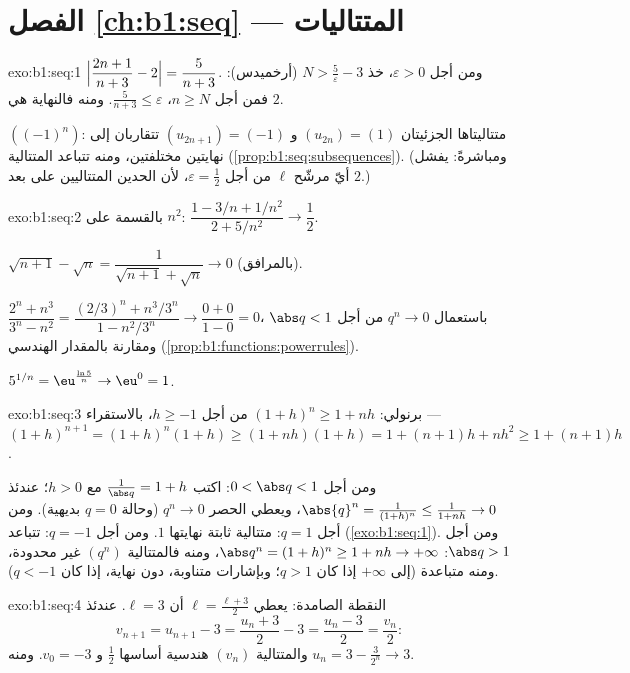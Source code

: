 \section*{الفصل \ref{ch:b1:seq} --- المتتاليات}

\begin{solution}{exo:b1:seq:1}
$\Bigl|\dfrac{2n+1}{n+3} - 2\Bigr| = \dfrac{5}{n+3}$. ومن أجل
$\varepsilon > 0$، خذ $N > \frac 5\varepsilon - 3$ (أرخميدس):
فمن أجل $n \geq N$، $\frac{5}{n+3} \leq \varepsilon$. ومنه فالنهاية هي
$2$.

$((-1)^n)$: متتاليتاها الجزئيتان $(u_{2n}) = (1)$ و $(u_{2n+1}) =
(-1)$ تتقاربان إلى نهايتين مختلفتين، ومنه تتباعد المتتالية
(\cref{prop:b1:seq:subsequences}). (ومباشرةً: يفشل أيّ مرشّح $\ell$
من أجل $\varepsilon = \frac12$، لأن الحدين المتتاليين على
بعد $2$.)
\end{solution}

\begin{solution}{exo:b1:seq:2}
بالقسمة على $n^2$: $\dfrac{1 - 3/n + 1/n^2}{2 + 5/n^2} \to
\dfrac12$.

$\sqrt{n+1} - \sqrt n = \dfrac{1}{\sqrt{n+1} + \sqrt n} \to 0$
(بالمرافق).

$\dfrac{2^n + n^3}{3^n - n^2} = \dfrac{(2/3)^n + n^3/3^n}{1 -
n^2/3^n} \to \dfrac{0 + 0}{1 - 0} = 0$، باستعمال $q^n \to 0$ من أجل $\abs q
< 1$ ومقارنة  بالمقدار الهندسي
(\cref{prop:b1:functions:powerrules}).

$5^{1/n} = \eu^{\frac{\ln 5}{n}} \to \eu^0 = 1$.
\end{solution}

\begin{solution}{exo:b1:seq:3}
برنولي: $(1+h)^n \geq 1 + nh$ من أجل $h \geq -1$، بالاستقراء ---
$(1+h)^{n+1} = (1+h)^n(1+h) \geq (1+nh)(1+h) = 1 + (n+1)h + nh^2
\geq 1 + (n+1)h$.

ومن أجل $0 < \abs q < 1$: اكتب $\frac{1}{\abs q} = 1 + h$ مع $h > 0$؛ عندئذ
$\abs{q}^n = \frac{1}{(1+h)^n} \leq \frac{1}{1 + nh} \to 0$، ويعطي
الحصر $q^n \to 0$ (وحالة $q = 0$ بديهية). ومن أجل $q = 1$:
متتالية ثابتة نهايتها $1$. ومن أجل $q = -1$: تتباعد
(\cref{exo:b1:seq:1}). ومن أجل $\abs q > 1$: $\abs q^n = (1 + h)^n \geq
1 + nh \to +\infty$، ومنه فالمتتالية $(q^n)$ غير محدودة، ومنه متباعدة (إلى
$+\infty$ إذا كان $q > 1$؛ وبإشارات متناوبة، دون نهاية، إذا كان $q <
-1$).
\end{solution}

\begin{solution}{exo:b1:seq:4}
النقطة الصامدة: يعطي $\ell = \frac{\ell + 3}{2}$ أن $\ell = 3$. عندئذ
\[
v_{n+1} = u_{n+1} - 3 = \frac{u_n + 3}{2} - 3 = \frac{u_n - 3}{2} =
\frac{v_n}{2}:
\]
والمتتالية $(v_n)$ هندسية أساسها $\frac12$ و $v_0 = -3$. ومنه $u_n = 3 -
\frac{3}{2^n} \to 3$.
\end{solution}

